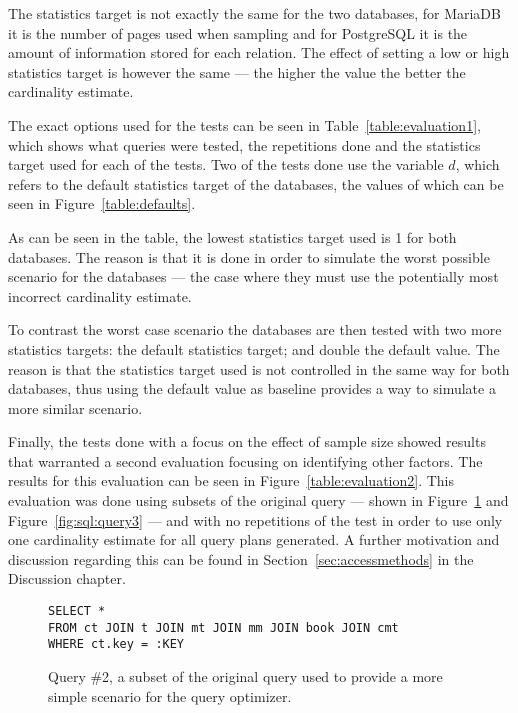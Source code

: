 The statistics target is not exactly the same for the two databases, for MariaDB
it is the number of pages used when sampling and for PostgreSQL it is the amount
of information stored for each relation. The effect of setting a low or high
statistics target is however the same --- the higher the value the better the
cardinality estimate.

The exact options used for the tests can be seen in
Table~\ref{table:evaluation1}, which shows what queries were tested, the
repetitions done and the statistics target used for each of the tests. Two of
the tests done use the variable $d$, which refers to the default statistics
target of the databases, the values of which can be seen in Figure~\ref{table:defaults}.

As can be seen in the table, the lowest statistics target used is 1 for both
databases. The reason is that it is done in order to simulate the worst possible
scenario for the databases --- the case where they must use the potentially most
incorrect cardinality estimate.

To contrast the worst case scenario the databases are then tested with two more
statistics targets: the default statistics target; and double the default value. The
reason is that the statistics target used is not controlled in the same way for
both databases, thus using the default value as baseline provides a way to
simulate a more similar scenario.

Finally, the tests done with a focus on the effect of sample size showed results
that warranted a second evaluation focusing on identifying other factors. The
results for this evaluation can be seen in Figure~\ref{table:evaluation2}. This
evaluation was done using subsets of the original query --- shown in
Figure~\ref{fig:sql:query2} and Figure~\ref{fig:sql:query3} --- and with no
repetitions of the test in order to use only one cardinality estimate for all
query plans generated. A further motivation and discussion regarding this can be
found in Section~\ref{sec:accessmethods} in the Discussion chapter.

\begin{figure}[ht]
\begin{verbatim}
SELECT *
FROM ct JOIN t JOIN mt JOIN mm JOIN book JOIN cmt
WHERE ct.key = :KEY
\end{verbatim}
  \caption[Query \#2, used for the second evaluation]{Query \#2, a subset of the
  original query used to provide a more simple scenario for the query
  optimizer.}\label{fig:sql:query2}
\end{figure}

